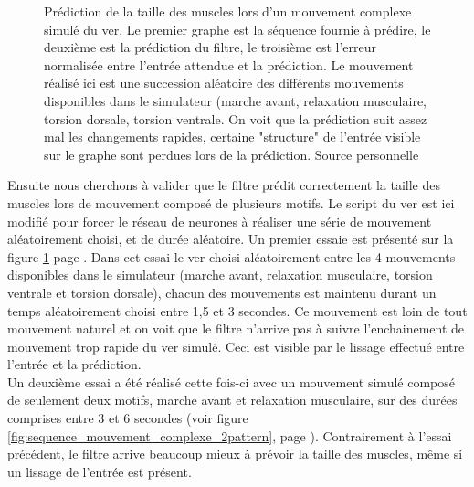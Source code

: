 \begin{figure}[ht]
   \begin{center}
   \end{center}
   \caption[Prédiction de la taille des muscles lors d'un mouvement complexe
   simulé]{Prédiction de la taille des muscles lors d'un mouvement complexe
   simulé du ver. Le premier graphe est la séquence fournie à prédire, le
   deuxième est la prédiction du filtre, le troisième est l'erreur normalisée
   entre l'entrée attendue et la prédiction. Le mouvement réalisé ici est une
   succession aléatoire des différents mouvements disponibles dans le simulateur
   (marche avant, relaxation musculaire, torsion dorsale, torsion ventrale. On
   voit que la prédiction suit assez mal les changements rapides, certaine
   "structure" de l'entrée visible sur le graphe sont perdues lors de la
   prédiction. Source personnelle}
   \label{fig:sequence_mouvement_complexe}
\end{figure}

Ensuite nous cherchons à valider que le filtre prédit correctement la taille
des muscles lors de mouvement composé de plusieurs motifs. Le script du ver est
ici modifié pour forcer le réseau de neurones à réaliser une série de mouvement
aléatoirement choisi, et de durée aléatoire. Un premier essaie est présenté
sur la figure \ref{fig:sequence_mouvement_complexe} page
\pageref{fig:sequence_mouvement_complexe}.  Dans cet essai le ver choisi
aléatoirement entre les 4 mouvements disponibles dans le simulateur (marche
avant, relaxation musculaire, torsion ventrale et torsion dorsale), chacun des
mouvements est maintenu durant un temps aléatoirement choisi entre 1,5 et 3
secondes. Ce mouvement est loin de tout mouvement naturel et on voit que le
filtre n'arrive pas à suivre l'enchainement de mouvement trop rapide du ver
simulé. Ceci est visible par le lissage effectué entre l'entrée et la
prédiction.\\


Un deuxième essai a été réalisé cette fois-ci avec un mouvement simulé composé
de seulement deux motifs, marche avant et relaxation musculaire, sur des durées
comprises entre 3 et 6 secondes (voir figure
\ref{fig:sequence_mouvement_complexe_2pattern}, page
\pageref{fig:sequence_mouvement_complexe_2pattern}). Contrairement à l'essai
précédent, le filtre arrive beaucoup mieux à prévoir la taille des muscles, même
si un lissage de l'entrée est présent.

